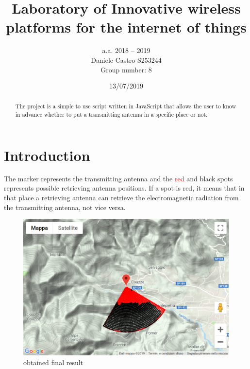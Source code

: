 \documentclass[peerreview]{IEEEtran}
\begin{document}
\title{Laboratory of Innovative wireless platforms for the internet of things}


\author{a.a. 2018 – 2019 \\
Daniele Castro S253244 \\
Group number: 8
}
\date{13/07/2019}

\maketitle
\tableofcontents
\listoffigures

\IEEEpeerreviewmaketitle
\begin{abstract}
The project is a simple to use script written in JavaScript that allows the user to know in advance whether to put a transmitting antenna in a specific place or not.
\end{abstract}
\section{Introduction}
The marker represents the transmitting antenna and the \textcolor{red}{red} and \textcolor{black}{black} spots represents possible retrieving antenna positions. If a spot is red, it means that in that place a retrieving antenna can retrieve the electromagnetic radiation from the transmitting antenna, not vice versa.
\begin{figure}[!ht]
\centering
\includegraphics[width=1.0\columnwidth]{project_finished} 
\caption{obtained final result}
\label{fig_project_finished}
\end{figure} 
\end{document}
